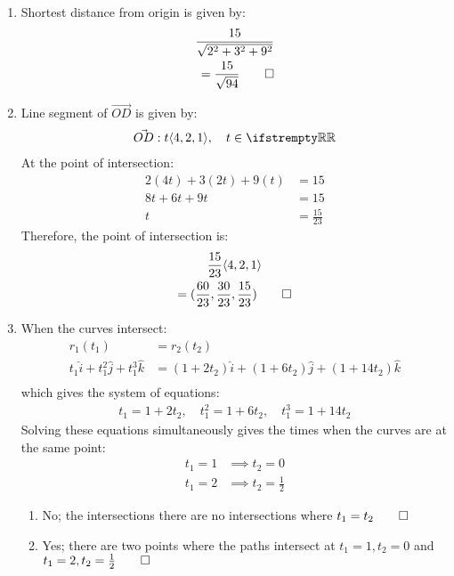 \documentclass[12pt, a4paper]{article}
\begin{document}
\begin{enumerate}[Q\arabic*.]
      \item Shortest distance from origin is given by:
        \begin{align*}
          \frac{15}{\sqrt{2^2 + 3^2 + 9^2}}\\
          = \frac{15}{\sqrt{94}} \qed
        \end{align*}

      \item Line segment of $\vec{OD}$ is given by:
        \begin{align*}
          \vec{OD}: t\langle 4,2,1\rangle,\quad t\in \RR 
        \end{align*}
        At the point of intersection:
        \begin{align*}
          2(4t) + 3(2t) + 9(t) &= 15\\
          8t + 6t + 9t &= 15\\
          t &= \frac{15}{23}
        \end{align*}
        Therefore, the point of intersection is:
        \begin{gather*}
          \frac{15}{23}\langle 4,2,1\rangle \\
          = (\frac{60}{23},\frac{30}{23},\frac{15}{23}) \qed
        \end{gather*}

  \item When the curves intersect:
    \begin{align*}
      r_1(t_1) &= r_2(t_2)\\
      t_1 \hat{i} + t_1^2 \hat{j} + t_1^3 \hat{k} &= (1+2t_2)\hat{i} + (1+6t_2)\hat{j} + (1+14t_2)\hat{k}\\
    \end{align*}
    which gives the system of equations:
    \begin{align*}
      t_1 = 1 + 2t_2,\quad t_1^2 = 1+6t_2,\quad t_1^3 = 1+14t_2
    \end{align*}
    Solving these equations simultaneously gives the times when the curves are at the same point:
    \begin{align*}
      t_1 = 1 &\implies t_2 = 0\\
      t_1 = 2 &\implies t_2 = \frac{1}{2}
    \end{align*}
    \begin{enumerate}[(\alph*)]
      \item No; the intersections there are no intersections where $t_1 = t_2 \qed$
      \item Yes; there are two points where the paths intersect at $t_1=1,t_2=0$ and $t_1=2,t_2=\frac{1}{2} \qed$
    \end{enumerate}
\end{enumerate}
\end{document}
